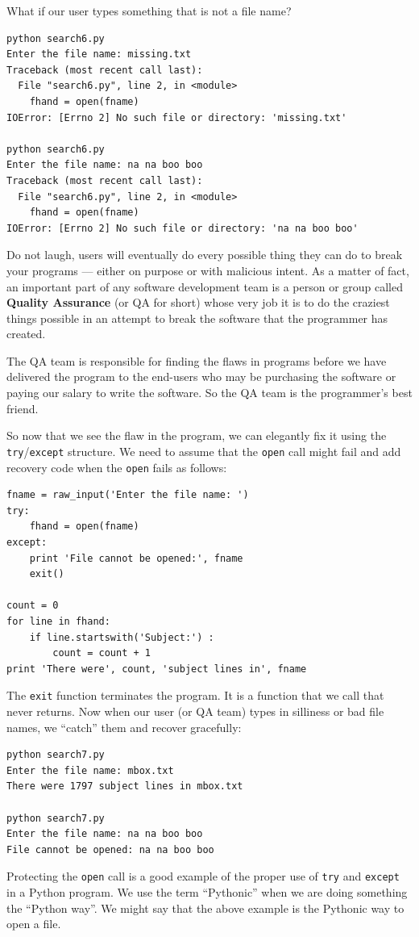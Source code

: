 \documentclass[10pt]{book}
\begin{document}
What if our user types something that is not a file name?
\beforeverb
\begin{verbatim}
python search6.py 
Enter the file name: missing.txt
Traceback (most recent call last):
  File "search6.py", line 2, in <module>
    fhand = open(fname)
IOError: [Errno 2] No such file or directory: 'missing.txt'

python search6.py 
Enter the file name: na na boo boo
Traceback (most recent call last):
  File "search6.py", line 2, in <module>
    fhand = open(fname)
IOError: [Errno 2] No such file or directory: 'na na boo boo'
\end{verbatim}
\afterverb
%
Do not laugh, users will eventually do every possible thing they can do 
to break your programs --- either on purpose or with malicious intent.
As a matter of fact, an important part of any software development
team is a person or group called {\bf Quality Assurance} (or QA for short)
whose very job it is to do the craziest things possible in an attempt
to break the software that the programmer has created.

The QA team is responsible for finding the flaws in programs before 
we have delivered the program to the end-users who may be purchasing the
software or paying our salary to write the software.  So the QA team
is the programmer's best friend.

So now that we see the flaw in the program, we can elegantly fix it using
the {\tt try}/{\tt except} structure.  We need to assume that the {\tt open}
call might fail and add recovery code when the {\tt open} fails
as follows:

\beforeverb
\begin{verbatim}
fname = raw_input('Enter the file name: ')
try:
    fhand = open(fname)
except:
    print 'File cannot be opened:', fname
    exit()

count = 0
for line in fhand:
    if line.startswith('Subject:') : 
        count = count + 1
print 'There were', count, 'subject lines in', fname
\end{verbatim}
\afterverb
%
The {\tt exit} function terminates the program.  It is a function
that we call that never returns.  Now when our user (or 
QA team) types in silliness or bad file names, 
we ``catch'' them and recover gracefully:
\beforeverb
\begin{verbatim}
python search7.py
Enter the file name: mbox.txt
There were 1797 subject lines in mbox.txt

python search7.py
Enter the file name: na na boo boo
File cannot be opened: na na boo boo
\end{verbatim}
\afterverb
%
Protecting the {\tt open} call is a good example 
of the proper use of {\tt try}
and {\tt except} in a Python program.  We use the term
``Pythonic'' when we are doing something the ``Python
way''.  We might say that the above example is 
the Pythonic way to open a file.
\end{document}
